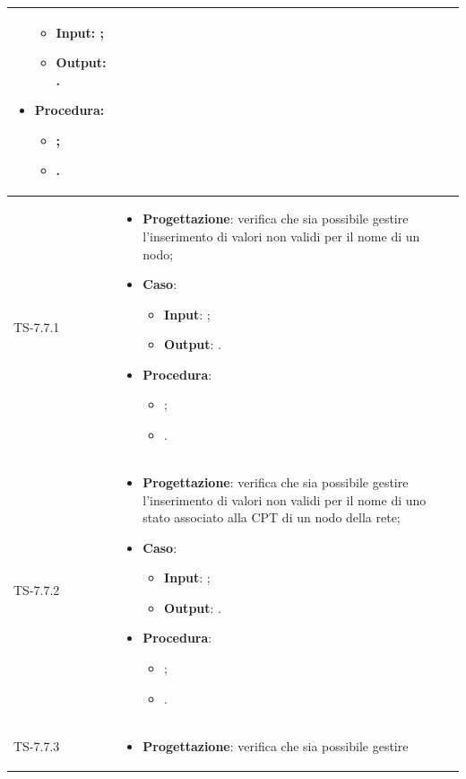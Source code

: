 \begin{longtable}{|C{2.5cm}|C{13cm}|}
\begin{itemize}
\begin{itemize}
		\item \textbf{Input}: ;
		\item \textbf{Output}: .
	\end{itemize}
	\item \textbf{Procedura}:
	\begin{itemize}
		\item ;
		\item .
	\end{itemize} 
\end{itemize}
	 \\
	\hline
	{TS-7.7.1} & 
\begin{itemize}
	\item \textbf{Progettazione}: verifica che sia  possibile gestire
	l'inserimento di valori non validi per il nome di un nodo;
	\item \textbf{Caso}: 
	\begin{itemize}
		\item \textbf{Input}: ;
		\item \textbf{Output}: .
	\end{itemize}
	\item \textbf{Procedura}:
	\begin{itemize}
		\item ;
		\item .
	\end{itemize} 
\end{itemize}
	 \\
	\hline
	{TS-7.7.2} & 
\begin{itemize}
	\item \textbf{Progettazione}: verifica che sia possibile gestire
	l'inserimento di valori non validi per il nome di uno stato associato alla CPT
	di un nodo della rete;
	\item \textbf{Caso}: 
	\begin{itemize}
		\item \textbf{Input}: ;
		\item \textbf{Output}: .
	\end{itemize}
	\item \textbf{Procedura}:
	\begin{itemize}
		\item ;
		\item .
	\end{itemize} 
\end{itemize}
	 \\
	\hline
	{TS-7.7.3} &
\begin{itemize}
	\item \textbf{Progettazione}: verifica che sia possibile gestire

\end{itemize}
\end{longtable}
